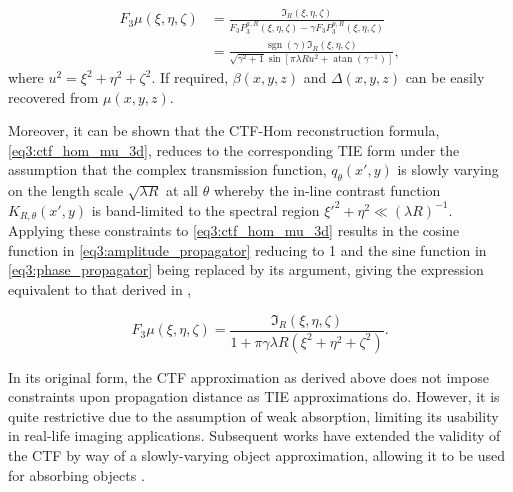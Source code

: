 \documentclass[twocolumn, switch]{article} %
\newcommand{\sgn}{\operatorname{sgn}}
\newcommand{\atan}{\operatorname{atan}}
\begin{document}
\begin{equation}
\begin{aligned}
    \label{eq3:ctf_hom_mu_3d}
    {F_3}\mu \left( {\xi ,\eta ,\zeta } \right) &= {\frac{{\Im _R}\left( {\xi ,\eta ,\zeta } \right)}{{F_3}P_3^{a,R}\left( {\xi ,\eta ,\zeta } \right) - \gamma {F_3}P_3^{p,R}\left( {\xi ,\eta ,\zeta } \right)}}\\
    &= {\frac{\sgn \left(\gamma\right) {\Im _R}\left( {\xi ,\eta ,\zeta } \right)}{\sqrt{\gamma^2 + 1}\sin{\left[\pi\lambda R u^2 + \atan{\left(\gamma^{-1}\right)}\right]}}},
\end{aligned}
\end{equation}
where $u^2 = \xi^2 + \eta^2 + \zeta^2$. If required, $\beta(x,y,z)$ and $\Delta(x,y,z)$ can be easily recovered from $\mu(x,y,z)$.

Moreover, it can be shown that the CTF-Hom reconstruction formula, \cref{eq3:ctf_hom_mu_3d}, reduces to the corresponding TIE form under the assumption that the complex transmission function, ${q_\theta }\left( {x',y} \right)$ is slowly varying on the length scale $\sqrt {\lambda R}$ at all $\theta $ whereby the in-line contrast function ${K_{R,\theta }}\left( {x',y} \right)$ is band-limited to the spectral region ${\xi '^2} + {\eta ^2} \ll {(\lambda R)^{ - 1}}$.  Applying these constraints to \cref{eq3:ctf_hom_mu_3d} results in the cosine function in \cref{eq3:amplitude_propagator} reducing to 1 and the sine function in \cref{eq3:phase_propagator} being replaced by its argument, giving the expression equivalent to that derived in \cite{Thompson2019FastTomography},

\begin{equation}
    \label{eq3:tie_hom_mu_3d}
    {F_3}\mu \left( {\xi ,\eta ,\zeta } \right) = \frac{{\Im _R}{\left( {\xi ,\eta ,\zeta } \right)}}{{1 + \pi \gamma \lambda R\left( {{\xi ^2} + {\eta ^2} + {\zeta ^2}} \right)}}.
\end{equation}

In its original form, the CTF approximation as derived above does not impose constraints upon propagation distance as TIE approximations do. However, it is quite restrictive due to the assumption of weak absorption, limiting its usability in real-life imaging applications.
Subsequent works have extended the validity of the CTF by way of a slowly-varying object approximation, allowing it to be used for absorbing objects \cite{Wu2003AImaging., Gureyev2004LinearRegion, Guigay2007MixedRegion., Nesterets2016PartiallyApproximation, Gureyev2017LinearConditions}. 
\end{document}
